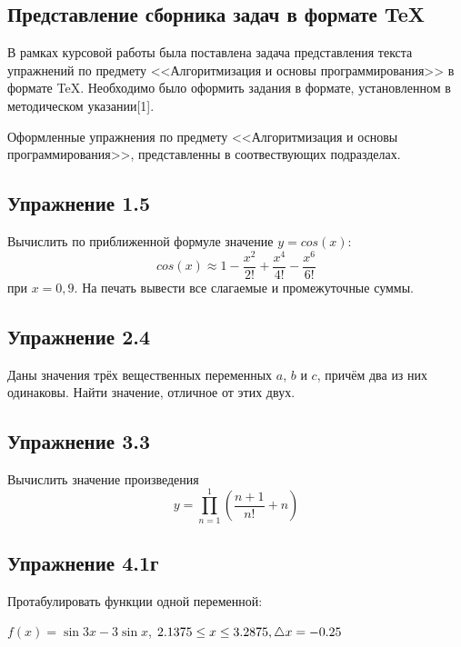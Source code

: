 \newpage
\begin{center}
\section{\fontsize{16pt}{16.8pt}Представление сборника задач в формате TeX }
\end{center}
\par
\fontsize{14pt}{16.8pt}\selectfont
В рамках курсовой работы была поставлена задача представления текста упражнений по предмету <<Алгоритмизация и основы программирования>> в формате TeX. Необходимо было оформить задания в формате, установленном в методическом указании[1].
\par
\fontsize{14pt}{16.8pt}\selectfont
Оформленные упражнения по предмету <<Алгоритмизация и основы программирования>>, представленны в соотвествующих подразделах.
\par

\subsection{\fontsize{14pt}{16.8pt}Упражнение 1.5}
\noindent
Вычислить по приближенной формуле значение $y=cos(x)$:\newline
$$ cos (x) \approx 1 - \frac{x^2}{2!} + \frac{x^4}{4!} - \frac{x^6}{6!} $$\newline
при $x=0,9.$ На печать вывести все слагаемые и промежуточные суммы.

\subsection{\fontsize{14pt}{16.8pt}Упражнение 2.4}
\noindent
Даны значения трёх вещественных переменных $a$, $b$ и $c$, причём два из них одинаковы. Найти значение, отличное от этих двух.

\subsection{\fontsize{14pt}{16.8pt}Упражнение 3.3}
\noindent
Вычислить значение произведения $$ y = \prod\limits_{n = 1}^1 \left( \frac{n + 1}{n!} + n \right) $$
  
\subsection{\fontsize{14pt}{16.8pt}Упражнение 4.1г}
\noindent
Протабулировать функции одной переменной:
\begin{flushright}
    $ f (x) = \sin 3x - 3 \sin x $, \tab $ 2.1375 \leq  x \leq 3.2875,\\ \triangle x = -0.25 $
\end{flushright}

